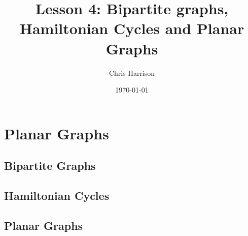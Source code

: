 \documentclass[11pt,a4paper]{article}
\title{Lesson 4: Bipartite graphs, Hamiltonian Cycles and Planar Graphs}
\author{Chris Harrison}
\date{\today}
\begin{document}
\maketitle 

\section{Planar Graphs}
\label{title}

\subsection{Bipartite Graphs}
\label{Bipartite}

\subsection{Hamiltonian Cycles}
\label{ham-cycles}

\subsection{Planar Graphs}
\label{planar}
\end{document}
